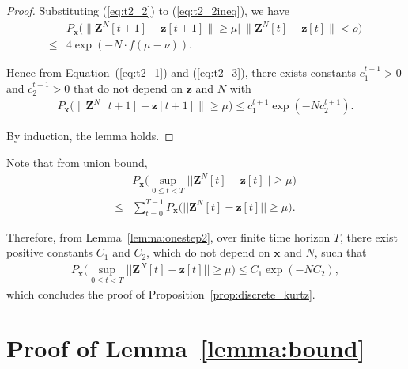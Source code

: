 \documentclass[11pt,twocolumn]{IEEEtran}
\begin{document}
\begin{proof}
Substituting (\ref{eq:t2_2}) to (\ref{eq:t2_2ineq}), we have
\begin{align}
&P_{\bm x}\Big(\big\| \bm Z^{N}[t{+}1]{-}\bm z[t{+}1] \big\| {\geq}\mu \Big| \ \big\| \bm Z^{N}[t]-\bm z[t] \big\| < \rho \Big)\nonumber\\
\leq& 4 \exp(-N \cdot f(\mu-\nu)). \label{eq:t2_3}
\end{align}

Hence from Equation~(\ref{eq:t2_1}) and (\ref{eq:t2_3}), there exists constants $c_1^{t+1}>0$ and $c_2^{t+1}>0$ that do not depend on $\bm z$ and $N$ with
\begin{align}
P_{\bm x}\Big(\big\| \bm Z^{N}[t{+}1]{-}\bm z[t{+}1] \big\| {\geq} \mu \Big) \leq c_1^{t{+}1} \exp(-N c_2^{t{+}1}). \nonumber
\end{align}

By induction, the lemma holds.
\end{proof}
\vspace{3pt}

Note that from union bound,
\begin{align}
&P_{\bm x}\Big( \sup_{0 \leq t < T} || \bm Z^{N}[t]-\bm z[t] || \geq \mu \Big) \nonumber\\
\leq& \sum_{t=0}^{T-1} P_{\bm x}\Big(|| \bm Z^{N}[t]-\bm z[t] || \geq \mu \Big). \label{eq:Pdecomp2}
\end{align}

Therefore, from Lemma~\ref{lemma:onestep2}, over finite time horizon $T$, there exist positive constants $C_1$ and $C_2$, which do not depend on $\bm x$ and $N$, such that
\begin{align}
\nonumber
P_{\bm x}\Big( \sup_{0 \leq t < T} || \bm Z^{N}[t]-\bm z[t] || \geq \mu \Big) \leq C_1 \exp(-N C_2),
\end{align}
which concludes the proof of Proposition~\ref{prop:discrete_kurtz}.

\vspace{5pt}


\section{Proof of Lemma~\ref{lemma:bound}}
\label{appen:bound}
\end{document}
